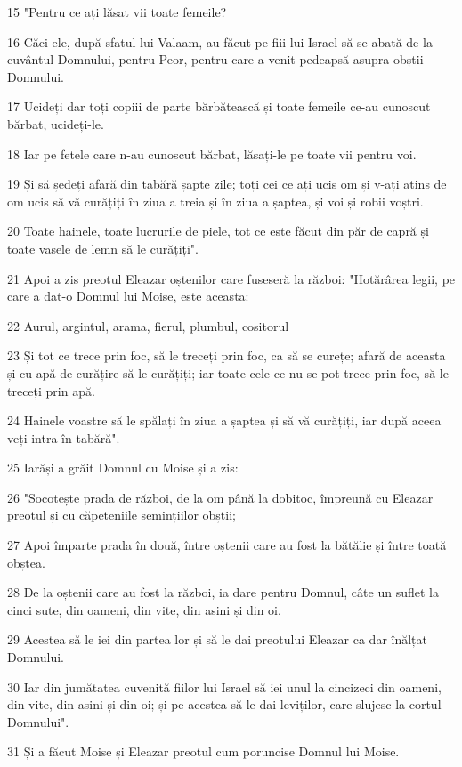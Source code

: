 \par 15 "Pentru ce ați lăsat vii toate femeile?
\par 16 Căci ele, după sfatul lui Valaam, au făcut pe fiii lui Israel să se abată de la cuvântul Domnului, pentru Peor, pentru care a venit pedeapsă asupra obștii Domnului.
\par 17 Ucideți dar toți copiii de parte bărbătească și toate femeile ce-au cunoscut bărbat, ucideți-le.
\par 18 Iar pe fetele care n-au cunoscut bărbat, lăsați-le pe toate vii pentru voi.
\par 19 Și să ședeți afară din tabără șapte zile; toți cei ce ați ucis om și v-ați atins de om ucis să vă curățiți în ziua a treia și în ziua a șaptea, și voi și robii voștri.
\par 20 Toate hainele, toate lucrurile de piele, tot ce este făcut din păr de capră și toate vasele de lemn să le curățiți".
\par 21 Apoi a zis preotul Eleazar oștenilor care fuseseră la război: "Hotărârea legii, pe care a dat-o Domnul lui Moise, este aceasta:
\par 22 Aurul, argintul, arama, fierul, plumbul, cositorul
\par 23 Și tot ce trece prin foc, să le treceți prin foc, ca să se curețe; afară de aceasta și cu apă de curățire să le curățiți; iar toate cele ce nu se pot trece prin foc, să le treceți prin apă.
\par 24 Hainele voastre să le spălați în ziua a șaptea și să vă curățiți, iar după aceea veți intra în tabără".
\par 25 Iarăși a grăit Domnul cu Moise și a zis:
\par 26 "Socotește prada de război, de la om până la dobitoc, împreună cu Eleazar preotul și cu căpeteniile semințiilor obștii;
\par 27 Apoi împarte prada în două, între oștenii care au fost la bătălie și între toată obștea.
\par 28 De la oștenii care au fost la război, ia dare pentru Domnul, câte un suflet la cinci sute, din oameni, din vite, din asini și din oi.
\par 29 Acestea să le iei din partea lor și să le dai preotului Eleazar ca dar înălțat Domnului.
\par 30 Iar din jumătatea cuvenită fiilor lui Israel să iei unul la cincizeci din oameni, din vite, din asini și din oi; și pe acestea să le dai leviților, care slujesc la cortul Domnului".
\par 31 Și a făcut Moise și Eleazar preotul cum poruncise Domnul lui Moise.
